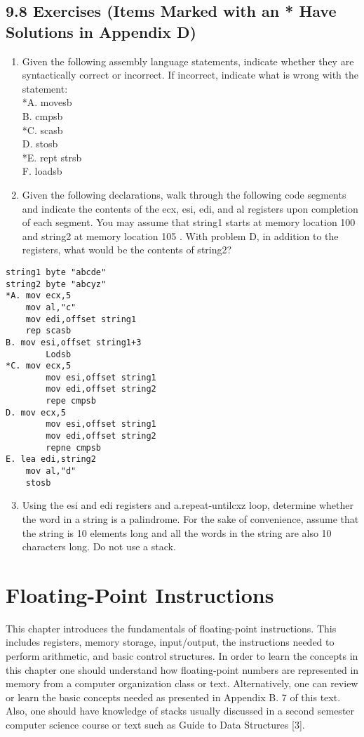 \documentclass[10pt]{article}
\begin{document}
\subsection*{9.8 Exercises (Items Marked with an * Have Solutions in Appendix D)}
\begin{enumerate}
  \item Given the following assembly language statements, indicate whether they are syntactically correct or incorrect. If incorrect, indicate what is wrong with the statement:\\
*A. movesb\\
B. cmpsb\\
*C. scasb\\
D. stosb\\
*E. rept strsb\\
F. loadsb
  \item Given the following declarations, walk through the following code segments and indicate the contents of the ecx, esi, edi, and al registers upon completion of each segment. You may assume that string1 starts at memory location 100 and string2 at memory location 105 . With problem D, in addition to the registers, what would be the contents of string2?
\end{enumerate}

\begin{verbatim}
string1 byte "abcde"
string2 byte "abcyz"
*A. mov ecx,5
    mov al,"c"
    mov edi,offset string1
    rep scasb
B. mov esi,offset string1+3
        Lodsb
*C. mov ecx,5
        mov esi,offset string1
        mov edi,offset string2
        repe cmpsb
D. mov ecx,5
        mov esi,offset string1
        mov edi,offset string2
        repne cmpsb
E. lea edi,string2
    mov al,"d"
    stosb
\end{verbatim}

\begin{enumerate}
  \setcounter{enumi}{2}
  \item Using the esi and edi registers and a.repeat-untilcxz loop, determine whether the word in a string is a palindrome. For the sake of convenience, assume that the string is 10 elements long and all the words in the string are also 10 characters long. Do not use a stack.
\end{enumerate}

\section*{Floating-Point Instructions}
This chapter introduces the fundamentals of floating-point instructions. This includes registers, memory storage, input/output, the instructions needed to perform arithmetic, and basic control structures. In order to learn the concepts in this chapter one should understand how floating-point numbers are represented in memory from a computer organization class or text. Alternatively, one can review or learn the basic concepts needed as presented in Appendix B. 7 of this text. Also, one should have knowledge of stacks usually discussed in a second semester computer science course or text such as Guide to Data Structures [3].
\end{document}
